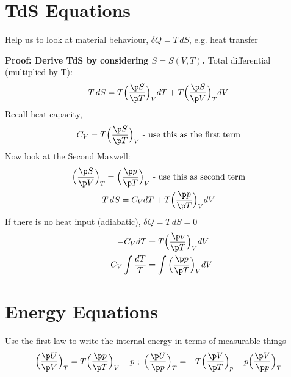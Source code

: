 \documentclass[a4paper, 11pt, normalem]{report}
\begin{document}
\section{TdS Equations}
Help us to look at material behaviour, $\delta Q = T\,dS$, e.g. heat transfer

\textbf{Proof: Derive TdS by considering $S = S(V,T)$.}
Total differential (multiplied by T):
\begin{equation*}
    T\,dS = T\Big(\frac{\p S}{\p T}\Big)_V dT + T\Big(\frac{\p S}{\p V}\Big)_T dV
\end{equation*}
Recall heat capacity,
\begin{equation*}
    C_V = T\Big(\frac{\p S}{\p T}\Big)_V \text{ - use this as the first term}
\end{equation*}
Now look at the Second Maxwell:
\begin{gather*}
    \Big(\frac{\p S}{\p V}\Big)_T = \Big(\frac{\p p}{\p T}\Big)_V \text{ - use this as second term} \\
    T\,dS = C_V dT + T\Big(\frac{\p p}{\p T}\Big)_V dV
\end{gather*}
If there is no heat input (adiabatic), $\delta Q = T\,dS = 0$
\begin{align*}
    -C_V dT &= T\Big(\frac{\p p}{\p T}\Big)_V dV \\
    -C_V \int \frac{dT}{T} &= \int \Big(\frac{\p p}{\p T}\Big)_V dV
\end{align*}

\section{Energy Equations}
Use the first law to write the internal energy in terms of measurable things
\begin{equation*}
    \Big(\frac{\p U}{\p V}\Big)_T = T\Big(\frac{\p p}{\p T}\Big)_V - p ~;~ \Big(\frac{\p U}{\p p}\Big)_T = -T\Big(\frac{\p V}{\p T}\Big)_p - p\Big(\frac{\p V}{\p p}\Big)_T
\end{equation*}
\end{document}
